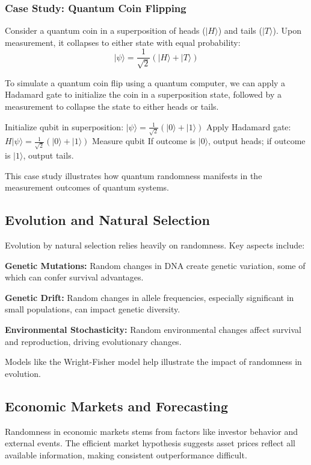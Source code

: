 \documentclass[12pt]{book} %
\begin{document}
\subsubsection{Case Study: Quantum Coin Flipping}
Consider a quantum coin in a superposition of heads (\(|H\rangle\)) and tails (\(|T\rangle\)). Upon measurement, it collapses to either state with equal probability:
\[ |\psi\rangle = \frac{1}{\sqrt{2}}(|H\rangle + |T\rangle) \]

To simulate a quantum coin flip using a quantum computer, we can apply a Hadamard gate to initialize the coin in a superposition state, followed by a measurement to collapse the state to either heads or tails.

\FloatBarrier
\begin{algorithm}[H]
\caption{Quantum Coin Flip}
\begin{algorithmic}[1]
\State Initialize qubit in superposition: \( |\psi\rangle = \frac{1}{\sqrt{2}}(|0\rangle + |1\rangle) \) 
\State Apply Hadamard gate: \( H|\psi\rangle = \frac{1}{\sqrt{2}}(|0\rangle + |1\rangle) \)
\State Measure qubit
\State If outcome is \(|0\rangle\), output heads; if outcome is \(|1\rangle\), output tails.
\end{algorithmic}
\end{algorithm}
\FloatBarrier

This case study illustrates how quantum randomness manifests in the measurement outcomes of quantum systems.

\subsection{Evolution and Natural Selection}
Evolution by natural selection relies heavily on randomness. Key aspects include:

\textbf{Genetic Mutations:} Random changes in DNA create genetic variation, some of which can confer survival advantages.

\textbf{Genetic Drift:} Random changes in allele frequencies, especially significant in small populations, can impact genetic diversity.

\textbf{Environmental Stochasticity:} Random environmental changes affect survival and reproduction, driving evolutionary changes.

Models like the Wright-Fisher model help illustrate the impact of randomness in evolution.

\subsection{Economic Markets and Forecasting}
Randomness in economic markets stems from factors like investor behavior and external events. The efficient market hypothesis suggests asset prices reflect all available information, making consistent outperformance difficult.
\end{document}
